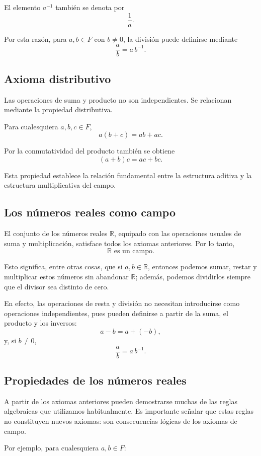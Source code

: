 \documentclass[12pt]{article}
\begin{document}
El elemento $a^{-1}$ también se denota por
\[
\frac{1}{a}.
\]

Por esta razón, para $a,b\in F$ con $b\neq0$, la división puede definirse
mediante
\[
\frac{a}{b}=a\,b^{-1}.
\]

\subsection*{Axioma distributivo}

Las operaciones de suma y producto no son independientes. Se relacionan
mediante la propiedad distributiva.

Para cualesquiera $a,b,c\in F$,
\[
a(b+c)=ab+ac.
\]

Por la conmutatividad del producto también se obtiene
\[
(a+b)c=ac+bc.
\]

Esta propiedad establece la relación fundamental entre la estructura aditiva
y la estructura multiplicativa del campo.

\subsection*{Los números reales como campo}

El conjunto de los números reales $\mathbb{R}$, equipado con las operaciones
usuales de suma y multiplicación, satisface todos los axiomas anteriores.
Por lo tanto,
\[
\boxed{\mathbb{R}\text{ es un campo}.}
\]

Esto significa, entre otras cosas, que si $a,b\in\mathbb{R}$, entonces
podemos sumar, restar y multiplicar estos números sin abandonar
$\mathbb{R}$; además, podemos dividirlos siempre que el divisor sea distinto
de cero.

En efecto, las operaciones de resta y división no necesitan introducirse
como operaciones independientes, pues pueden definirse a partir de la suma,
el producto y los inversos:
\[
a-b=a+(-b),
\]
y, si $b\neq0$,
\[
\frac{a}{b}=a\,b^{-1}.
\]

\subsection*{Propiedades de los n\'umeros reales}

A partir de los axiomas anteriores pueden demostrarse muchas de las reglas
algebraicas que utilizamos habitualmente. Es importante señalar que estas
reglas no constituyen nuevos axiomas: son consecuencias lógicas de los
axiomas de campo.

Por ejemplo, para cualesquiera $a,b\in F$:
\end{document}

